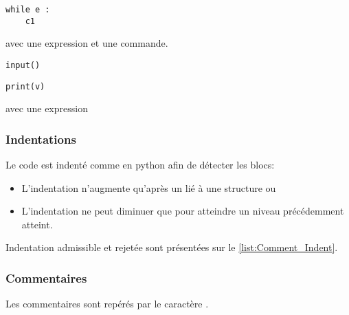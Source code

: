 \begin{minipage}[c]{0.38\textwidth}
\begin{verbatim}
while e :
	c1
\end{verbatim}
\end{minipage}
\hspace{1cm}
\begin{minipage}[c]{0.38\textwidth}
	avec  une expression et  une commande.	
\end{minipage}
\vspace{0.5cm}

\begin{minipage}[c]{0.38\textwidth}
\begin{verbatim}
input()
\end{verbatim}
\end{minipage}
\vspace{0.5cm}

\begin{minipage}[c]{0.38\textwidth}
\begin{verbatim}
print(v)
\end{verbatim}
\end{minipage}
\hspace{1cm}
\begin{minipage}[c]{0.38\textwidth}
avec  une expression	
\end{minipage}

\subsubsection{Indentations}
Le code est indenté comme en python afin de détecter les blocs:
\begin{itemize}
	\item L'indentation n'augmente qu'après un  lié à une structure  ou 
	\item L'indentation ne peut diminuer que pour atteindre un niveau précédemment atteint.
\end{itemize}

Indentation admissible et rejetée sont présentées sur le \cref{list:Comment_Indent}.

\subsubsection{Commentaires}
Les commentaires sont repérés par le caractère \pyinline{#} .

